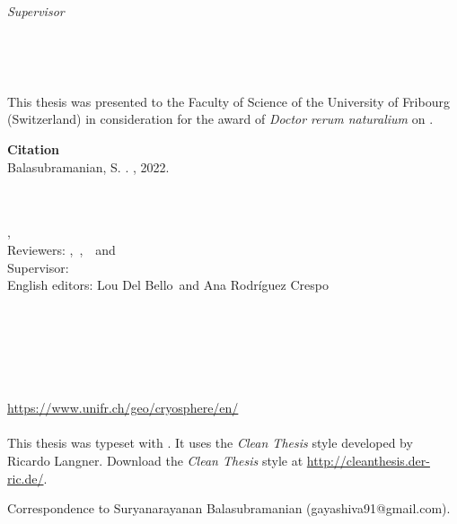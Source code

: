 \begin{titlepage}
	\begin{minipage}[t]{.27\textwidth}
		\raggedleft
		\textit{Supervisor}
	\end{minipage}
	\hspace*{15pt}
	\begin{minipage}[t]{.65\textwidth}
		{\Large \thesisFirstSupervisor} \\
	\end{minipage} \\[10mm]


\end{titlepage}



This thesis was presented to the Faculty of Science of the University of Fribourg (Switzerland) in consideration
for the award of \textit{Doctor rerum naturalium} on \thesisDate.

\vfill
{\large \textbf{Citation} \\}
Balasubramanian, S. \thesisTitle . \thesisUniversityGroup, 2022.

\hfill
\vfill
{
	\small
	\textbf{\thesisName} \\
	\textit{\thesisTitle} \\
	\thesisSubject, \thesisDate \\
	Reviewers: \thesisFirstReviewer,\ \thesisSecondReviewer,\ \thesisThirdReviewer\ and \thesisFourthReviewer \\
	Supervisor: \thesisFirstSupervisor \\
	English editors: Lou Del Bello\ and Ana Rodríguez Crespo\\[1.5em]
	\textbf{\thesisUniversity} \\
	\textit{\thesisUniversityGroup} \\
	\thesisUniversityDepartment \\
	\thesisUniversityStreetAddress \\
	\thesisUniversityCity \\
	\thesisUniversityPostalCode \\
  \url{https://www.unifr.ch/geo/cryosphere/en/}\\
\\
  This thesis was typeset with \LaTeXe.
  It uses the \textit{Clean Thesis} style developed by Ricardo Langner.
  Download the \textit{Clean Thesis} style at \url{http://cleanthesis.der-ric.de/}.

  Correspondence to Suryanarayanan Balasubramanian (gayashiva91@gmail.com).
}

